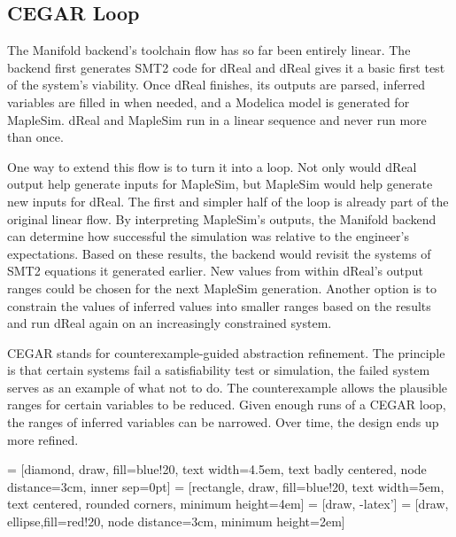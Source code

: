 \subsection{CEGAR Loop}


The Manifold backend's toolchain flow has so far been entirely linear.
The backend first generates SMT2 code for dReal and dReal gives it a basic first test of the system's viability.
Once dReal finishes, its outputs are parsed, inferred variables are filled in when needed, and a Modelica model is generated for MapleSim.
dReal and MapleSim run in a linear sequence and never run more than once.

One way to extend this flow is to turn it into a loop.
Not only would dReal output help generate inputs for MapleSim, but MapleSim would help generate new inputs for dReal.
The first and simpler half of the loop is already part of the original linear flow.
By interpreting MapleSim's outputs, the Manifold backend can determine how successful the simulation was relative to the engineer's expectations.
Based on these results, the backend would revisit the systems of SMT2 equations it generated earlier.
New values from within dReal's output ranges could be chosen for the next MapleSim generation.
Another option is to constrain the values of inferred values into smaller ranges based on the results and run dReal again on an increasingly constrained system.

CEGAR stands for counterexample-guided abstraction refinement.
The principle is that certain systems fail a satisfiability test or simulation, the failed system serves as an example of what not to do.
The counterexample allows the plausible ranges for certain variables to be reduced.
Given enough runs of a CEGAR loop, the ranges of inferred variables can be narrowed.
Over time, the design ends up more refined.

 = [diamond, draw, fill=blue!20, 
    text width=4.5em, text badly centered, node distance=3cm, inner sep=0pt]
 = [rectangle, draw, fill=blue!20, 
    text width=5em, text centered, rounded corners, minimum height=4em]
 = [draw, -latex']
 = [draw, ellipse,fill=red!20, node distance=3cm,
    minimum height=2em]

